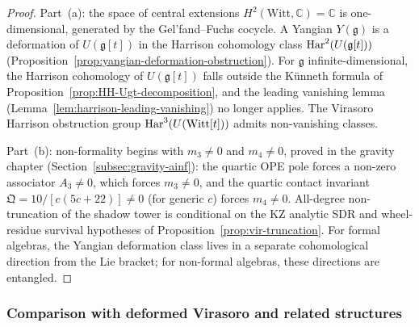 \begin{proof}
Part~(a): the space of central extensions
$H^2(\mathrm{Witt}, \mathbb{C}) = \mathbb{C}$ is one-dimensional,
generated by the Gel'fand--Fuchs cocycle. A Yangian
$Y(\mathfrak{g})$ is a deformation of $U(\mathfrak{g}{[t]})$ in the
Harrison cohomology class $\operatorname{Har}^2(U(\mathfrak{g}{[t]}))$
(Proposition~\ref{prop:yangian-deformation-obstruction}). For
$\mathfrak{g}$ infinite-dimensional, the Harrison cohomology of
$U(\mathfrak{g}{[t]})$ falls outside the K\"unneth formula of
Proposition~\ref{prop:HH-Ugt-decomposition}, and the leading
vanishing lemma (Lemma~\ref{lem:harrison-leading-vanishing}) no
longer applies. The Virasoro Harrison obstruction group
$\operatorname{Har}^3(U(\mathrm{Witt}{[t]}))$ admits non-vanishing classes.

Part~(b): non-formality begins with $m_3 \ne 0$ and $m_4\ne0$,
proved in the gravity chapter (Section~\ref{subsec:gravity-ainf}):
the quartic OPE pole forces a non-zero associator $A_3 \ne 0$, which
forces $m_3 \ne 0$, and the quartic contact invariant
$\mathfrak{Q} = 10/[c(5c+22)] \ne 0$ (for generic $c$) forces
$m_4 \ne 0$. All-degree non-truncation of the shadow tower is
conditional on the KZ analytic SDR and wheel-residue survival
hypotheses of Proposition~\ref{prop:vir-truncation}. For formal
algebras, the Yangian deformation class lives in a separate
cohomological direction from the Lie bracket; for non-formal
algebras, these directions are entangled.
\end{proof}

\subsubsection{Comparison with deformed Virasoro and related structures}
\label{subsubsec:virasoro-comparison}


